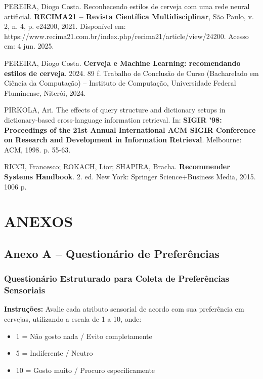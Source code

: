 \documentclass[12pt,a4paper]{article}
\begin{document}
\begin{thebibliography}{20}
PEREIRA, Diogo Costa. Reconhecendo estilos de cerveja com uma rede neural artificial. \textbf{RECIMA21 -- Revista Científica Multidisciplinar}, São Paulo, v. 2, n. 4, p. e24200, 2021. Disponível em: https://www.recima21.com.br/index.php/recima21/article/view/24200. Acesso em: 4 jun. 2025.

PEREIRA, Diogo Costa. \textbf{Cerveja e Machine Learning: recomendando estilos de cerveja}. 2024. 89 f. Trabalho de Conclusão de Curso (Bacharelado em Ciência da Computação) -- Instituto de Computação, Universidade Federal Fluminense, Niterói, 2024.

PIRKOLA, Ari. The effects of query structure and dictionary setups in dictionary-based cross-language information retrieval. In: \textbf{SIGIR '98: Proceedings of the 21st Annual International ACM SIGIR Conference on Research and Development in Information Retrieval}. Melbourne: ACM, 1998. p. 55-63.

RICCI, Francesco; ROKACH, Lior; SHAPIRA, Bracha. \textbf{Recommender Systems Handbook}. 2. ed. New York: Springer Science+Business Media, 2015. 1006 p.

\end{thebibliography}

\newpage
\section{ANEXOS}

\subsection{Anexo A -- Questionário de Preferências}

\subsubsection{Questionário Estruturado para Coleta de Preferências Sensoriais}

\textbf{Instruções:} Avalie cada atributo sensorial de acordo com sua preferência em cervejas, utilizando a escala de 1 a 10, onde:
\begin{itemize}
\item 1 = Não gosto nada / Evito completamente
\item 5 = Indiferente / Neutro
\item 10 = Gosto muito / Procuro especificamente
\end{itemize}
\end{document}
